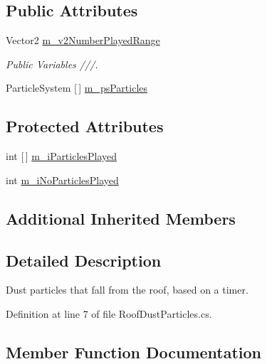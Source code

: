 \subsection*{Public Attributes}
\begin{DoxyCompactItemize}
\item 
Vector2 \mbox{\hyperlink{class_roof_dust_particles_acd2394ef4f5fd51fa0f8eebd68da0dad}{m\+\_\+v2\+Number\+Played\+Range}}
\begin{DoxyCompactList}\small\item\em Public Variables ///. \end{DoxyCompactList}\item 
Particle\+System \mbox{[}$\,$\mbox{]} \mbox{\hyperlink{class_roof_dust_particles_adfd3e083d1b15d81ebc87b46bf23894d}{m\+\_\+ps\+Particles}}
\end{DoxyCompactItemize}
\subsection*{Protected Attributes}
\begin{DoxyCompactItemize}
\item 
int \mbox{[}$\,$\mbox{]} \mbox{\hyperlink{class_roof_dust_particles_a9dc23ba1a13e1678157743dbe79888dd}{m\+\_\+i\+Particles\+Played}}
\item 
int \mbox{\hyperlink{class_roof_dust_particles_a6902fe9ce67824fd2c79a62ef831acfc}{m\+\_\+i\+No\+Particles\+Played}}
\end{DoxyCompactItemize}
\subsection*{Additional Inherited Members}


\subsection{Detailed Description}
Dust particles that fall from the roof, based on a timer. 



Definition at line 7 of file Roof\+Dust\+Particles.\+cs.



\subsection{Member Function Documentation}
\mbox{\label{class_roof_dust_particles_a895fc128e3fdb6c87a4267baf26827e9}} 
